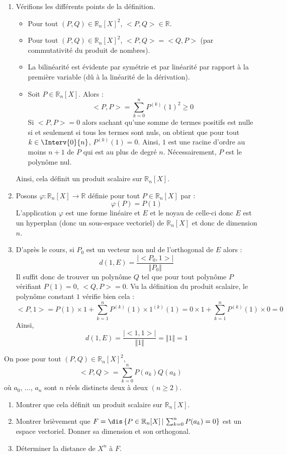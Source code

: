 \documentclass[a4paper,10pt]{report}
\begin{document}
\corr \begin{enumerate}
\item Vérifions les différents points de la définition.

\begin{itemize}
\item Pour tout $(P,Q) \in \mathbb{R}_n[X]^2$, $<P,Q> \in \mathbb{R}$.
\item Pour tout $(P,Q) \in \mathbb{R}_n[X]^2$, $<P,Q>= <Q,P>$ (par commutativité du produit de nombres).
\item La bilinéarité est évidente par symétrie et par linéarité par rapport à la première variable (dû à la linéarité de la dérivation).
\item Soit $P \in \mathbb{R}_n[X]$. Alors :
$$ <P,P> = \sum_{k=0}^{n} P^{(k)}(1)^2 \geq 0$$
Si $<P,P>=0$ alors sachant qu'une somme de termes positifs est nulle si et seulement si tous les termes sont nuls, on obtient que pour tout $k \in \Interv{0}{n}$, $P^{(k)}(1)=0$. Ainsi, $1$ est une racine d'ordre au moins $n+1$ de $P$ qui est au plus de degré $n$. Nécessairement, $P$ est le polynôme nul. 
\end{itemize}
Ainsi, cela définit un produit scalaire sur $\mathbb{R}_n[X]$.
\item Posons $\varphi : \mathbb{R}_n[X] \rightarrow \mathbb{R}$ définie pour tout $P \in \mathbb{R}_n[X]$ par :
$$ \varphi(P)= P(1)$$
L'application $\varphi$ est une forme linéaire et $E$ et le noyau de celle-ci donc $E$ est un hyperplan (donc un sous-espace vectoriel) de $\mathbb{R}_n[X]$ et donc de dimension $n$.
\item D'après le cours, si $P_0$ est un vecteur non nul de l'orthogonal de $E$ alors :
$$ d(1,E) = \dfrac{\vert <P_0,1> \vert }{\Vert P_0 \Vert}$$
Il suffit donc de trouver un polynôme $Q$ tel que pour tout polynôme $P$ vérifiant $P(1)=0$, $<Q,P>=0$. Vu la définition du produit scalaire, le polynôme constant $1$ vérifie bien cela :
$$ <P,1> = P(1) \times 1 + \sum_{k=1}^n P^{(k)}(1) \times 1^{(k)}(1) = 0\times 1 + \sum_{k=1}^n P^{(k)}(1) \times 0 = 0$$
Ainsi,
$$ d(1,E) = \dfrac{\vert <1,1> \vert }{\Vert 1 \Vert} = \Vert 1 \Vert = 1$$
\end{enumerate}


\begin{Exa} On pose pour tout $(P,Q) \in \mathbb{R}_n[X]^2$,
$$ <P,Q> = \sum_{k=0}^n P(a_k) Q(a_k)$$
où $a_0$, $\ldots$, $a_n$ sont $n$ réels distincts deux à deux $(n \geq 2)$.
\begin{enumerate}
\item Montrer que cela définit un produit scalaire sur $\mathbb{R}_n[X]$.
\item Montrer brièvement que $F= \dis \left\lbrace P \in \mathbb{R}_n[X] \, \vert \, \sum_{k=0}^n P(a_k)=0 \right\rbrace$ est un espace vectoriel. Donner sa dimension et son orthogonal.
\item Déterminer la distance de $X^n$ à $F$.
\end{enumerate}
\end{Exa}
\end{document}
